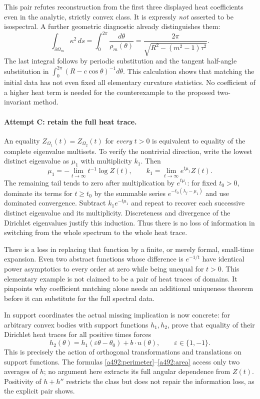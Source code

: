 \documentclass[11pt]{article}
\begin{document}
This pair refutes reconstruction from the first three displayed heat
coefficients even in the analytic, strictly convex class. It is expressly
\emph{not} asserted to be isospectral. A further geometric diagnostic already
distinguishes them:
\begin{equation}\label{a492:curvature}
 \int_{\partial\Omega_m}\kappa^2\,ds
   =\int_0^{2\pi}\frac{d\theta}{\rho_m(\theta)}
   =\frac{2\pi}{\sqrt{R^2-(m^2-1)\tau^2}}.
\end{equation}
The last integral follows by periodic substitution and the tangent
half-angle substitution in $\int_0^{2\pi}(R-c\cos\theta)^{-1}d\theta$.
This calculation shows that matching the initial data has not even fixed
all elementary curvature statistics. No coefficient of a higher heat term
is needed for the counterexample to the proposed two-invariant method.

\paragraph{Attempt C: retain the full heat trace.}
An equality $Z_{\Omega_1}(t)=Z_{\Omega_2}(t)$ for \emph{every} $t>0$
is equivalent to equality of the complete eigenvalue multisets. To verify
the nontrivial direction, write the lowest distinct eigenvalue as $\mu_1$
with multiplicity $k_1$. Then
\[
 \mu_1=-\lim_{t\to\infty}t^{-1}\log Z(t),\qquad
 k_1=\lim_{t\to\infty}e^{t\mu_1}Z(t).
\]
The remaining tail tends to zero after multiplication by $e^{t\mu_1}$:
for fixed $t_0>0$, dominate its terms for $t\ge t_0$ by the summable
series $e^{-t_0(\lambda_j-\mu_1)}$ and use dominated convergence.
Subtract $k_1e^{-t\mu_1}$ and repeat to recover each successive distinct
eigenvalue and its multiplicity. Discreteness and divergence of the
Dirichlet eigenvalues justify this induction. Thus there is no loss of
information in switching from the whole spectrum to the whole heat trace.

There is a loss in replacing that function by a finite, or merely formal,
small-time expansion. Even two abstract functions whose difference is
$e^{-1/t}$ have identical power asymptotics to every order at zero while
being unequal for $t>0$. This elementary example is not claimed to be a
pair of heat traces of domains. It pinpoints why coefficient matching alone
needs an additional uniqueness theorem before it can substitute for the
full spectral data.

In support coordinates the actual missing implication is now concrete:
for arbitrary convex bodies with support functions $h_1,h_2$, prove that
equality of their Dirichlet heat traces for all positive times forces
\[
 h_2(\theta)=h_1(\varepsilon\theta-\theta_0)+b\cdot u(\theta),
                         \qquad \varepsilon\in\{1,-1\}.
\]
This is precisely the action of orthogonal transformations and translations
on support functions. The formulas \eqref{a492:perimeter}--\eqref{a492:area}
access only two averages of $h$; no argument here extracts its full angular
dependence from $Z(t)$. Positivity of $h+h''$ restricts the class but does
not repair the information loss, as the explicit pair shows.
\end{document}
